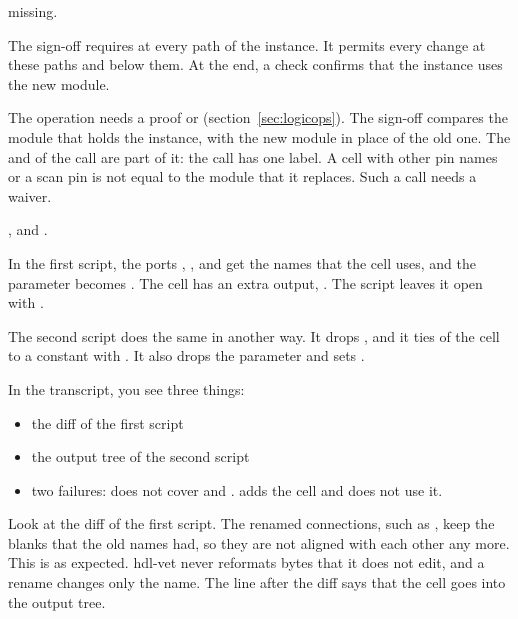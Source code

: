 \begin{entry}{}
  missing.
\item[Sign-off] The sign-off requires  at every path of the
  instance. It permits every change at these paths and below them. At the end, a check
  confirms that the instance uses the new module.
\item[Waiver] The operation needs a proof or  (section~\ref{sec:logicops}).
  The sign-off compares the module that holds the instance, with the new module in place
  of the old one. The  and  of the call are part of it: the
  call has one label. A cell with other pin names or a scan pin is not equal to the module
  that it replaces. Such a call needs a waiver.
\item[Example] ,  and
  .
\end{entry}











In the first script, the ports , ,  and
 get the names that the cell uses, and the parameter 
becomes . The cell has an extra output, . The script
leaves it open with .

The second script does the same in another way. It drops , and it ties
 of the cell to a constant with . It also drops the parameter
 and sets .

In the transcript, you see three things:

\begin{itemize}
\item the diff of the first script
\item the output tree of the second script
\item two failures:  does not cover  and
  .  adds the cell and does not use it.
\end{itemize}

Look at the diff of the first script. The renamed connections, such as ,
keep the blanks that the old names had, so they are not aligned with each other any more.
This is as expected. hdl-vet never reformats bytes that it does not edit, and a rename
changes only the name. The line  after the
diff says that the cell goes into the output tree.

